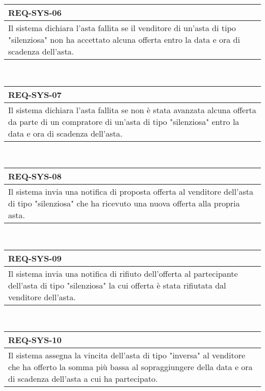         \begin{tabular}{|p{}|}
            \hline
            \multicolumn{1}{|l|}{\cellcolor{head}\textbf{REQ-SYS-06}} \\
            \hline
            Il sistema dichiara l'asta fallita se il venditore di un'asta di tipo "silenziosa" non ha accettato alcuna offerta entro la data e ora di scadenza dell'asta. \\
            \hline
        \end{tabular} \smallskip \\
        \begin{tabular}{|p{}|}
            \hline
            \multicolumn{1}{|l|}{\cellcolor{head}\textbf{REQ-SYS-07}} \\
            \hline
            Il sistema dichiara l'asta fallita se non è stata avanzata alcuna offerta da parte di un compratore di un'asta di tipo "silenziosa" entro la data e ora di scadenza dell'asta. \\
            \hline
        \end{tabular} \smallskip \\
        \begin{tabular}{|p{}|}
            \hline
            \multicolumn{1}{|l|}{\cellcolor{head}\textbf{REQ-SYS-08}} \\
            \hline
            Il sistema invia una notifica di proposta offerta al venditore dell'asta di tipo "silenziosa" che ha ricevuto una nuova offerta alla propria asta. \\
            \hline
        \end{tabular} \smallskip \\
        \begin{tabular}{|p{}|}
            \hline
            \multicolumn{1}{|l|}{\cellcolor{head}\textbf{REQ-SYS-09}} \\
            \hline
            Il sistema invia una notifica di rifiuto dell'offerta al partecipante dell'asta di tipo "silenziosa" la cui offerta è stata rifiutata dal venditore dell'asta. \\
            \hline
        \end{tabular} \smallskip \\
        \begin{tabular}{|p{}|}
            \hline
            \multicolumn{1}{|l|}{\cellcolor{head}\textbf{REQ-SYS-10}} \\
            \hline
            Il sistema assegna la vincita dell'asta di tipo "inversa" al venditore che ha offerto la somma più bassa al sopraggiungere della data e ora di scadenza dell'asta a cui ha partecipato. \\
            \hline
        \end{tabular} \smallskip \\
